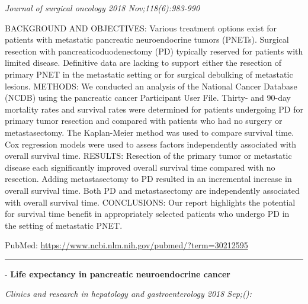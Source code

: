 \documentclass[]{article}
\begin{document}
\emph{Journal of surgical oncology 2018 Nov;118(6):983-990}

BACKGROUND AND OBJECTIVES: Various treatment options exist for patients
with metastatic pancreatic neuroendocrine tumors (PNETs). Surgical
resection with pancreaticoduodenectomy (PD) typically reserved for
patients with limited disease. Definitive data are lacking to support
either the resection of primary PNET in the metastatic setting or for
surgical debulking of metastatic lesions. METHODS: We conducted an
analysis of the National Cancer Database (NCDB) using the pancreatic
cancer Participant User File. Thirty- and 90-day mortality rates and
survival rates were determined for patients undergoing PD for primary
tumor resection and compared with patients who had no surgery or
metastasectomy. The Kaplan-Meier method was used to compare survival
time. Cox regression models were used to assess factors independently
associated with overall survival time. RESULTS: Resection of the primary
tumor or metastatic disease each significantly improved overall survival
time compared with no resection. Adding metastasectomy to PD resulted in
an incremental increase in overall survival time. Both PD and
metastasectomy are independently associated with overall survival time.
CONCLUSIONS: Our report highlights the potential for survival time
benefit in appropriately selected patients who undergo PD in the setting
of metastatic PNET.

PubMed: \url{https://www.ncbi.nlm.nih.gov/pubmed/?term=30212595}

{}

{}

\begin{center}\rule{0.5\linewidth}{\linethickness}\end{center}

 - \textbf{Life expectancy in pancreatic neuroendocrine cancer}

\emph{Clinics and research in hepatology and gastroenterology 2018
Sep;():}
\end{document}
